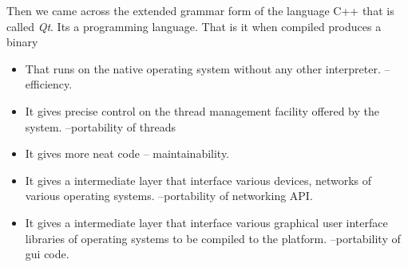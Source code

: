 \documentclass[pdftex,12pt,a4paper,pdfencoding=unicode]{article}
\begin{document}
\begin{onehalfspace}
      Then we came across the extended grammar form of the language C++ that is called \emph{Qt}. Its a programming language.
      That is it when compiled produces a binary
      \begin{itemize}
        \item That runs on the native operating system without any other interpreter. --efficiency.
        \item It gives precise control on the thread management facility offered by the system. --portability of threads
        \item It gives more neat code -- maintainability.
        \item It gives a intermediate layer that interface various devices, networks of various operating systems.
          --portability of networking API.
        \item It gives a intermediate layer that interface various graphical user interface libraries of operating systems
          to be compiled to the platform. --portability of gui code.
      \end{itemize}
\end{onehalfspace}
\end{document}
